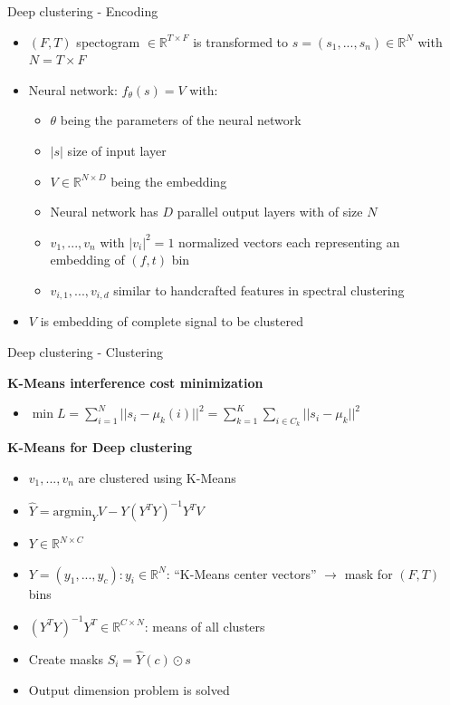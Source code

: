 \documentclass[xcolor=table,mathserif,9pt]{beamer}    %
\begin{document}
\begin{frame}{Deep clustering - Encoding}

 \begin{itemize}
	 \item $(F,T)$ spectogram $\in \mathbb{R}^{T \times F}$ is transformed to 
		 $s = (s_1, ..., s_n) \in \mathbb{R}^{N}$ with $N = T \times F$
	 \item Neural network: \emph{$f_{\theta}(s) = V$} with: 
		\begin{itemize}
			\item $\theta$ being the parameters of the neural network
			\item $|s|$ size of input layer
			\item $V \in \mathbb{R}^{N \times D}$ being the embedding
			\item Neural network has $D$ parallel output layers with 
			      of size $N$
		      \item $v_1, ..., v_n$ with \emph{$|v_i|^2 = 1$} normalized vectors
			      each representing an embedding of $(f,t)$ bin 
			\item $v_{i,1}, ..., v_{i,d}$ similar to handcrafted 
			      features in spectral clustering
		\end{itemize}
	\item $V$ is embedding of complete signal to be clustered
 \end{itemize}
\end{frame}

\begin{frame}{Deep clustering - Clustering}

\textbf{K-Means interference cost minimization}
\begin{itemize}
	\item $\min L = \sum_{i=1}^{N} ||s_i - \mu_k(i)||^2 = \sum_{k=1}^{K} \sum_{i \in C_k} ||s_i - \mu_k||^2$
\end{itemize}
\vspace{10mm}

	\textbf{K-Means for Deep clustering}
\begin{itemize}
	\item $v_1, ..., v_n$ are clustered using K-Means
	\item \emph{$\hat{Y} = \text{argmin}_{Y} {V - Y(Y^TY)^{-1}Y^TV}$}
	\item $Y \in \mathbb{R}^{N \times C}$
	\item $Y = (y_1,... ,y_c): y_i \in \mathbb{R}^{N}$: ``K-Means center vectors'' $\to$ mask for $(F,T)$ bins
	\item $(Y^TY)^{-1}Y^T \in \mathbb{R}^{C \times N}$: means of all clusters
	\item Create masks \emph{$S_i = \hat{Y}(c) \odot s$}
	\item Output dimension problem is solved 
\end{itemize}
	
\end{frame}
\end{document}
